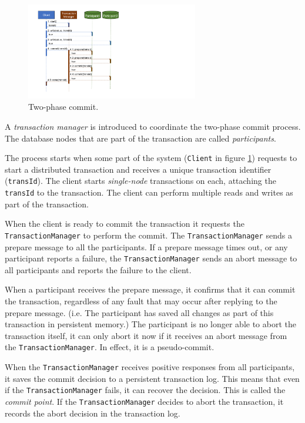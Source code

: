 \begin{figure}[h!]
    \centering
    \includegraphics[trim=55 70 420 30,clip,width=0.67\textwidth]{diagrams/2phase-commit-seq.png}
    \caption{Two-phase commit.}
    \label{fig:2pc-seq}
\end{figure}

A \emph{transaction manager} is introduced to coordinate the two-phase commit process.
The database nodes that are part of the transaction are called \emph{participants}.

The process starts when some part of the system (\texttt{Client} in figure \ref{fig:2pc-seq})
requests to start a distributed transaction and receives a unique transaction identifier (\texttt{transId}).
The client starts \emph{single-node} transactions on each, attaching the \texttt{transId} to the transaction.
The client can perform multiple reads and writes as part of the transaction.

When the client is ready to commit the transaction it requests the \texttt{TransactionManager} to perform the commit.
The \texttt{TransactionManager} sends a prepare message to all the participants.
If a prepare message times out, or any participant reports a failure,
the \texttt{TransactionManager} sends an abort message to all participants and reports the failure to the client.

When a participant receives the prepare message, it confirms that it can commit the transaction,
regardless of any fault that may occur after replying to the prepare message.
(i.e. The participant has saved all changes as part of this transaction in persistent memory.)
The participant is no longer able to abort the transaction itself,
it can only abort it now if it receives an abort message from the \texttt{TransactionManager}.
In effect, it is a pseudo-commit.

When the \texttt{TransactionManager} receives positive responses from all participants,
it saves the commit decision to a persistent transaction log.
This means that even if the \texttt{TransactionManager} fails, it can recover the decision.
This is called the \emph{commit point}.
If the \texttt{TransactionManager} decides to abort the transaction,
it records the abort decision in the transaction log.

